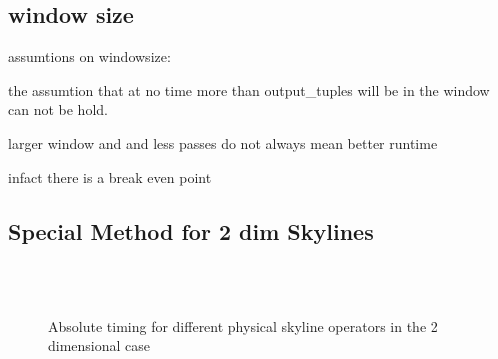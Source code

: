 \subsection{window size}
assumtions on windowsize:

the assumtion that at no time more than output\_tuples will be in the window can not be hold.

larger window and and less passes do not always mean better runtime

infact there is a break even point



\subsection{Special Method for 2 dim Skylines}

\twocolumn
\begin{figure}[ht]
\centering
{} \\
 \\
\caption{Absolute timing for different physical skyline operators in the 2 dimensional case}
\end{figure}
